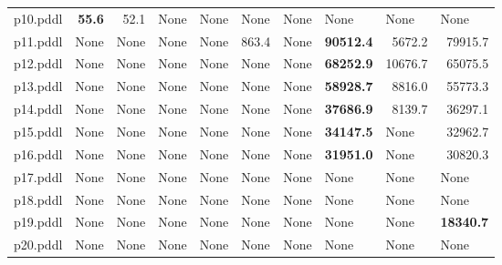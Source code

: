 \documentclass{article}
\begin{document}
\begin{tabular}{@{}lrrrrrrrrr@{}}
p10.pddl & \textbf{55.6} & 52.1 & \multicolumn{1}{|l|}{None} & \multicolumn{1}{|l|}{None} & \multicolumn{1}{|l|}{None} & \multicolumn{1}{|l|}{None} & \multicolumn{1}{|l|}{None} & \multicolumn{1}{|l|}{None} & \multicolumn{1}{|l|}{None} \\
p11.pddl & \multicolumn{1}{|l|}{None} & \multicolumn{1}{|l|}{None} & \multicolumn{1}{|l|}{None} & \multicolumn{1}{|l|}{None} & 863.4 & \multicolumn{1}{|l|}{None} & \textbf{90512.4} & 5672.2 & 79915.7 \\
p12.pddl & \multicolumn{1}{|l|}{None} & \multicolumn{1}{|l|}{None} & \multicolumn{1}{|l|}{None} & \multicolumn{1}{|l|}{None} & \multicolumn{1}{|l|}{None} & \multicolumn{1}{|l|}{None} & \textbf{68252.9} & 10676.7 & 65075.5 \\
p13.pddl & \multicolumn{1}{|l|}{None} & \multicolumn{1}{|l|}{None} & \multicolumn{1}{|l|}{None} & \multicolumn{1}{|l|}{None} & \multicolumn{1}{|l|}{None} & \multicolumn{1}{|l|}{None} & \textbf{58928.7} & 8816.0 & 55773.3 \\
p14.pddl & \multicolumn{1}{|l|}{None} & \multicolumn{1}{|l|}{None} & \multicolumn{1}{|l|}{None} & \multicolumn{1}{|l|}{None} & \multicolumn{1}{|l|}{None} & \multicolumn{1}{|l|}{None} & \textbf{37686.9} & 8139.7 & 36297.1 \\
p15.pddl & \multicolumn{1}{|l|}{None} & \multicolumn{1}{|l|}{None} & \multicolumn{1}{|l|}{None} & \multicolumn{1}{|l|}{None} & \multicolumn{1}{|l|}{None} & \multicolumn{1}{|l|}{None} & \textbf{34147.5} & \multicolumn{1}{|l|}{None} & 32962.7 \\
p16.pddl & \multicolumn{1}{|l|}{None} & \multicolumn{1}{|l|}{None} & \multicolumn{1}{|l|}{None} & \multicolumn{1}{|l|}{None} & \multicolumn{1}{|l|}{None} & \multicolumn{1}{|l|}{None} & \textbf{31951.0} & \multicolumn{1}{|l|}{None} & 30820.3 \\
p17.pddl & \multicolumn{1}{|l|}{None} & \multicolumn{1}{|l|}{None} & \multicolumn{1}{|l|}{None} & \multicolumn{1}{|l|}{None} & \multicolumn{1}{|l|}{None} & \multicolumn{1}{|l|}{None} & \multicolumn{1}{|l|}{None} & \multicolumn{1}{|l|}{None} & \multicolumn{1}{|l|}{None} \\
p18.pddl & \multicolumn{1}{|l|}{None} & \multicolumn{1}{|l|}{None} & \multicolumn{1}{|l|}{None} & \multicolumn{1}{|l|}{None} & \multicolumn{1}{|l|}{None} & \multicolumn{1}{|l|}{None} & \multicolumn{1}{|l|}{None} & \multicolumn{1}{|l|}{None} & \multicolumn{1}{|l|}{None} \\
p19.pddl & \multicolumn{1}{|l|}{None} & \multicolumn{1}{|l|}{None} & \multicolumn{1}{|l|}{None} & \multicolumn{1}{|l|}{None} & \multicolumn{1}{|l|}{None} & \multicolumn{1}{|l|}{None} & \multicolumn{1}{|l|}{None} & \multicolumn{1}{|l|}{None} & \textbf{18340.7} \\
p20.pddl & \multicolumn{1}{|l|}{None} & \multicolumn{1}{|l|}{None} & \multicolumn{1}{|l|}{None} & \multicolumn{1}{|l|}{None} & \multicolumn{1}{|l|}{None} & \multicolumn{1}{|l|}{None} & \multicolumn{1}{|l|}{None} & \multicolumn{1}{|l|}{None} & \multicolumn{1}{|l|}{None} \\
\end{tabular}
\end{document}
